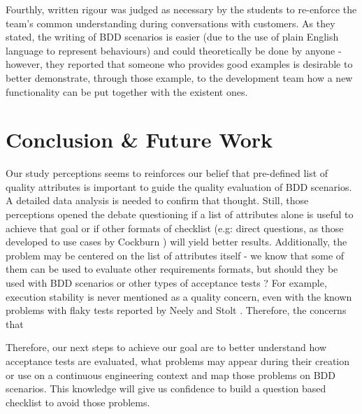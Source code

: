Fourthly, written rigour was judged as necessary by the students to re-enforce the team's common understanding during conversations with customers. As they stated, the writing of BDD scenarios is easier (due to the use of plain English language to represent behaviours) and could theoretically be done by anyone - however, they reported that someone who provides good examples is desirable to better demonstrate, through those example, to the development team how a new functionality can be put together with the existent ones. 

\section{Conclusion \& Future Work}

Our study perceptions seems to reinforces our belief that pre-defined list of quality attributes is important to guide the quality evaluation of BDD scenarios. A detailed data analysis is needed to confirm that thought. Still, those perceptions opened the debate questioning if a list of attributes alone is useful to achieve that goal or if other formats of checklist (e.g: direct questions, as those developed to use cases by Cockburn \cite{Cockburn_2000}) will yield better results. Additionally, the problem may be centered on the list of attributes itself - we know that some of them can be used to evaluate other requirements formats, but should they be used with BDD scenarios or other types of acceptance tests ? For example, execution stability is never mentioned as a quality concern, even with the known problems with flaky tests reported by Neely and Stolt \cite{Neely_Stolt_2013}. Therefore, the concerns that 

Therefore, our next steps to achieve our goal are to better understand how acceptance tests are evaluated, what problems may appear during their creation or use on a continuous engineering context and map those problems on BDD scenarios. This knowledge will give us confidence to build a question based checklist to avoid those problems.